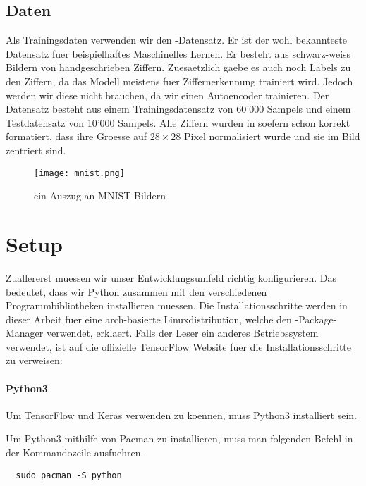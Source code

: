 \para{}
\subsection{Daten}
Als Trainingsdaten verwenden wir den -Datensatz. Er ist der wohl
bekannteste Datensatz fuer beispielhaftes Maschinelles Lernen.
Er besteht aus schwarz-weiss Bildern von handgeschrieben Ziffern.
Zuesaetzlich gaebe es auch noch Labels zu den Ziffern, da das Modell meistens
fuer Ziffernerkennung trainiert wird. Jedoch werden
wir diese nicht brauchen, da wir einen Autoencoder trainieren.
\para{}
Der Datensatz besteht aus einem Trainingsdatensatz von 60'000 Sampels und einem Testdatensatz
von 10'000 Sampels. Alle Ziffern wurden in soefern schon korrekt formatiert,
dass ihre Groesse auf $28 \times 28$ Pixel normalisiert wurde und sie im Bild
zentriert sind.

\begin{figure}
  \centering
  \texttt{[image: mnist.png]}
  \caption{ein Auszug an MNIST-Bildern \cite{res:mnist_images}}
\end{figure}

\para{}
\cite{net:mnist}

\section{Setup}
Zuallererst muessen wir unser Entwicklungsumfeld richtig konfigurieren. Das
bedeutet, dass wir Python zusammen mit den verschiedenen Programmbibliotheken
installieren muessen.
\para{}
Die Installationsschritte werden in dieser Arbeit fuer eine arch-basierte
Linuxdistribution, welche den -Package-Manager verwendet, erklaert.
\para{}
Falls der Leser ein anderes Betriebssystem verwendet, ist auf die offizielle
TensorFlow Website fuer die Installationsschritte zu verweisen:
\para{}

\paragraph{Python3}
Um TensorFlow und Keras verwenden zu koennen, muss Python3 installiert sein.

Um Python3 mithilfe von Pacman zu installieren, muss man folgenden Befehl in
der Kommandozeile ausfuehren.
\begin{verbatim}
  sudo pacman -S python
\end{verbatim}

